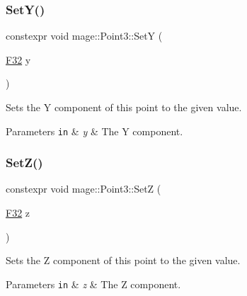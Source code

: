 \subsubsection{\texorpdfstring{Set\+Y()}{SetY()}}
{\footnotesize\ttfamily constexpr void mage\+::\+Point3\+::\+SetY (\begin{DoxyParamCaption}\item[{\mbox{\hyperlink{namespacemage_aa97e833b45f06d60a0a9c4fc22ae02c0}{F32}}}]{y }\end{DoxyParamCaption})\hspace{0.3cm}{\ttfamily [noexcept]}}

Sets the Y component of this point to the given value.


\begin{DoxyParams}[1]{Parameters}
\mbox{\tt in}  & {\em y} & The Y component. \\
\hline
\end{DoxyParams}
\mbox{\label{structmage_1_1_point3_a37225058268534202f89421467138668}} 
\subsubsection{\texorpdfstring{Set\+Z()}{SetZ()}}
{\footnotesize\ttfamily constexpr void mage\+::\+Point3\+::\+SetZ (\begin{DoxyParamCaption}\item[{\mbox{\hyperlink{namespacemage_aa97e833b45f06d60a0a9c4fc22ae02c0}{F32}}}]{z }\end{DoxyParamCaption})\hspace{0.3cm}{\ttfamily [noexcept]}}

Sets the Z component of this point to the given value.


\begin{DoxyParams}[1]{Parameters}
\mbox{\tt in}  & {\em z} & The Z component. \\
\hline
\end{DoxyParams}
